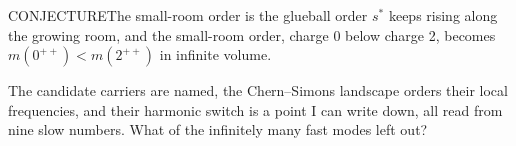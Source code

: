 \begin{claim}{CONJECTURE}{The small-room order is the glueball order}\label{b:glueball}
$s^*$ keeps rising along the growing room, and the small-room order, charge 0 below charge 2, becomes
$m(0^{++})<m(2^{++})$ in infinite volume.
\end{claim}

The candidate carriers are named, the Chern--Simons landscape orders their local frequencies, and their harmonic
switch is a point I can write down, all read from nine slow numbers. What of the infinitely many fast modes left out?
